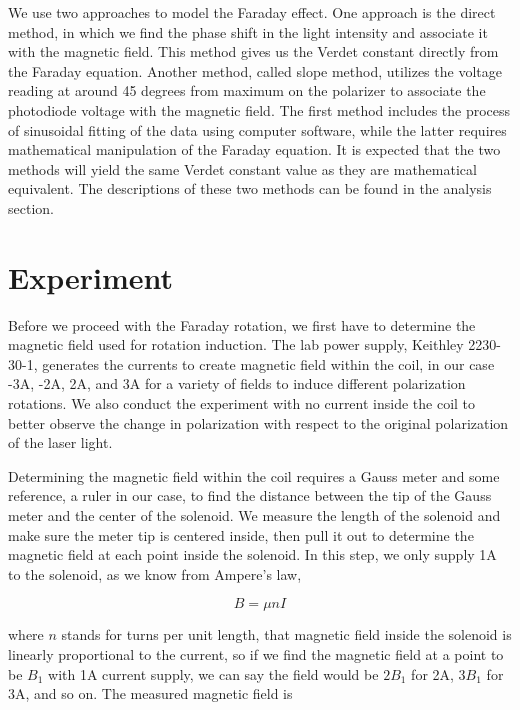 \documentclass[prb,preprint]{revtex4-1}
\begin{document}
We use two approaches to model the Faraday effect. One approach is the direct method, in which we find the phase shift in the light intensity and associate it with the magnetic field. This method gives us the Verdet constant directly from the Faraday equation. Another method, called slope method, utilizes the voltage reading at around 45 degrees from maximum on the polarizer to associate the photodiode voltage with the magnetic field. The first method includes the process of sinusoidal fitting of the data using computer software, while the latter requires mathematical manipulation of the Faraday equation. It is expected that the two methods will yield the same Verdet constant value as they are mathematical equivalent. The descriptions of these two methods can be found in the analysis section.

\section{Experiment}

Before we proceed with the Faraday rotation, we first have to determine the magnetic field used for rotation induction. The lab power supply, Keithley 2230-30-1, generates the currents to create magnetic field within the coil, in our case -3A, -2A, 2A, and 3A for a variety of fields to induce different polarization rotations. We also conduct the experiment with no current inside the coil to better observe the change in polarization with respect to the original polarization of the laser light.

Determining the magnetic field within the coil requires a Gauss meter and some reference, a ruler in our case, to find the distance between the tip of the Gauss meter and the center of the solenoid. We measure the length of the solenoid and make sure the meter tip is centered inside, then pull it out to determine the magnetic field at each point inside the solenoid. In this step, we only supply 1A to the solenoid, as we know from Ampere's law,

\begin{equation}
\label{Ampere}
B=\mu nI
\end{equation}

where $n$ stands for turns per unit length, that magnetic field inside the solenoid is linearly proportional to the current, so if we find the magnetic field at a point to be $B_1$ with 1A current supply, we can say the field would be $2B_1$ for 2A, $3B_1$ for 3A, and so on. The measured magnetic field is
\end{document}
